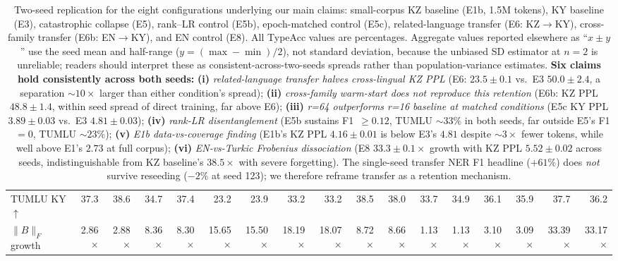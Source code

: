 \documentclass[11pt]{article}
\begin{document}
\begin{table}[t]
\begin{tabular}{lrrrrrrrrrrrrrrrr}
TUMLU KY $\uparrow$         & 37.3 & 38.6 & 34.7 & 37.4 & 23.2 & 23.9 & 33.2 & 33.2 & 38.5 & 38.0 & 33.7 & 34.9 & 36.1 & 35.9 & 37.7 & 36.2 \\
$\|B\|_F$ growth            & 2.86$\times$ & 2.88$\times$ & 8.36$\times$ & 8.30$\times$ & 15.65$\times$ & 15.50$\times$ & 18.19$\times$ & 18.07$\times$ & 8.72$\times$ & 8.66$\times$ & 1.13$\times$ & 1.13$\times$ & 3.10$\times$ & 3.09$\times$ & 33.39$\times$ & 33.17$\times$ \\
\bottomrule
\end{tabular}
\caption{Two-seed replication for the eight configurations underlying our main claims: small-corpus KZ baseline (E1b, 1.5M tokens), KY baseline (E3), catastrophic collapse (E5), rank--LR control (E5b), epoch-matched control (E5c), related-language transfer (E6: KZ$\rightarrow$KY), cross-family transfer (E6b: EN$\rightarrow$KY), and EN control (E8). All TypeAcc values are percentages. Aggregate values reported elsewhere as ``$x \pm y$'' use the seed mean and half-range ($y = (\max-\min)/2$), not standard deviation, because the unbiased SD estimator at $n{=}2$ is unreliable; readers should interpret these as consistent-across-two-seeds spreads rather than population-variance estimates. \textbf{Six claims hold consistently across both seeds:} \textbf{(i)} \emph{related-language transfer halves cross-lingual KZ PPL} (E6: $23.5 \pm 0.1$ vs.\ E3 $50.0 \pm 2.4$, a separation $\sim 10\times$ larger than either condition's spread); \textbf{(ii)} \emph{cross-family warm-start does not reproduce this retention} (E6b: KZ PPL $48.8 \pm 1.4$, within seed spread of direct training, far above E6); \textbf{(iii)} \emph{r=64 outperforms r=16 baseline at matched conditions} (E5c KY PPL $3.89 \pm 0.03$ vs.\ E3 $4.81 \pm 0.03$); \textbf{(iv)} \emph{rank-LR disentanglement} (E5b sustains F1~$\geq 0.12$, TUMLU $\sim 33\%$ in both seeds, far outside E5's F1$=0$, TUMLU $\sim 23\%$); \textbf{(v)} \emph{E1b data-vs-coverage finding} (E1b's KZ PPL $4.16 \pm 0.01$ is below E3's $4.81$ despite $\sim 3\times$ fewer tokens, while well above E1's $2.73$ at full corpus); \textbf{(vi)} \emph{EN-vs-Turkic Frobenius dissociation} (E8 $33.3 \pm 0.1\times$ growth with KZ PPL $5.52 \pm 0.02$ across seeds, indistinguishable from KZ baseline's $38.5\times$ with severe forgetting). The single-seed transfer NER F1 headline ($+61\%$) does \emph{not} survive reseeding ($-2\%$ at seed 123); we therefore reframe transfer as a retention mechanism.}
\label{tab:seed_variance}
\end{table}
\end{document}
